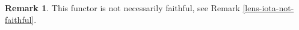 \documentclass[11pt,a4paper]{article}
\theoremstyle{plain}
\newtheorem{theorem}{Theorem}[subsection]
\theoremstyle{definition}
\newtheorem{remark}[theorem]{Remark}
\newcommand{\C}{\mathscr{C}}
\newcommand{\Optic}{\mathbf{Optic}}
\newcommand{\todo}[1]{\textcolor{red}{\small #1}}
\begin{document}
\begin{remark}
This functor is not necessarily faithful, see Remark \ref{lens-iota-not-faithful}.
\end{remark}


\end{document}
